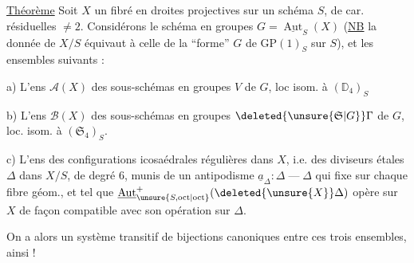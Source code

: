 \uline{Théorème} \quad Soit \(X\) un fibré en droites projectives sur un schéma \(S\), de car.  résiduelles \(\ne 2\). Considérons le  schéma en groupes \(G=\underline{\operatorname{Aut}}_S(X)\) (\uline{NB} la donnée de \(X/S\) équivaut à celle de la ``forme'' \(G\) de \(\mathrm{GP}(1)_S\) sur \(S\)), et les ensembles suivants :

a) L'ens \(\mathcal A(X)\) des sous-schémas en groupes \(V\) de \(G\), loc isom. à \((\mathbb D_4)_S\)

b) L'ens  \(\mathcal B(X)\) des sous-schémas en groupes \(\deleted{\unsure{\mathfrak S|G}}\Gamma\) de \(G\), loc. isom. à \((\mathfrak S_4)_S\).

c) L'ens des configurations icosaédrales régulières dans \(X\), i.e. des diviseurs étales \(\Delta\) dans \(X/S\), de degré \(6\), munis de un antipodisme \(\underline a_\Delta:\Delta \mathbin{\text{---}} \Delta\) qui   fixe sur chaque fibre géom., et tel que \(\underline{\operatorname{Aut}}_{\unsure{S,\rm oct|\rm oct}}^+(\deleted{\unsure{X}}\Delta)\) opère sur \(X\) de façon compatible avec son opération sur \(\Delta\).

On a alors un système transitif de bijections canoniques entre ces trois ensembles,  ainsi !

